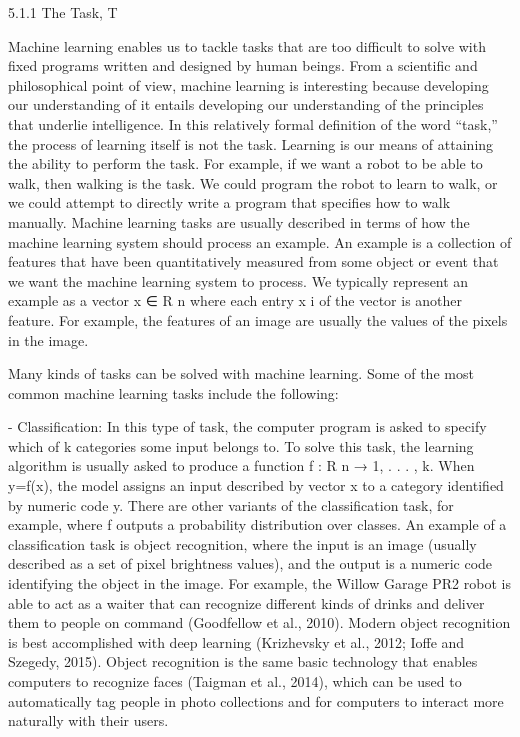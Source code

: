 \documentclass[11pt]{article}
\begin{document}
5.1.1 The Task, T

Machine learning enables us to tackle tasks that are too diﬃcult to solve with fixed programs written and designed by human beings.
From a scientific and philosophical point of view, machine learning is interesting because developing our understanding of it entails developing our understanding of the principles that underlie intelligence.
In this relatively formal definition of the word “task,” the process of learning itself is not the task.
Learning is our means of attaining the ability to perform the task.
For example, if we want a robot to be able to walk, then walking is the task.
We could program the robot to learn to walk, or we could attempt to directly write a program that specifies how to walk manually.
Machine learning tasks are usually described in terms of how the machine learning system should process an example.
An example is a collection of features that have been quantitatively measured from some object or event that we want the machine learning system to process.
We typically represent an example as a vector x ∈ R n where each entry x i of the vector is another feature.
For example, the features of an image are usually the values of the pixels in the image.

Many kinds of tasks can be solved with machine learning.
Some of the most common machine learning tasks include the following:

- Classification: In this type of task, the computer program is asked to specify which of k categories some input belongs to.
To solve this task, the learning algorithm is usually asked to produce a function f : R n → {1, . . . , k}.
When y=f(x), the model assigns an input described by vector x to a category identified by numeric code y.
There are other variants of the classification task, for example, where f outputs a probability distribution over classes.
An example of a classification task is object recognition, where the input is an image (usually described as a set of pixel brightness values), and the
output is a numeric code identifying the object in the image.
For example, the Willow Garage PR2 robot is able to act as a waiter that can recognize different kinds of drinks and deliver them to people on command (Goodfellow et al., 2010).
Modern object recognition is best accomplished with deep learning (Krizhevsky et al., 2012; Ioffe and Szegedy, 2015).
Object recognition is the same basic technology that enables computers to recognize faces (Taigman et al., 2014), which can be used to automatically tag people in photo collections and for computers to interact more naturally with their users.
\end{document}
